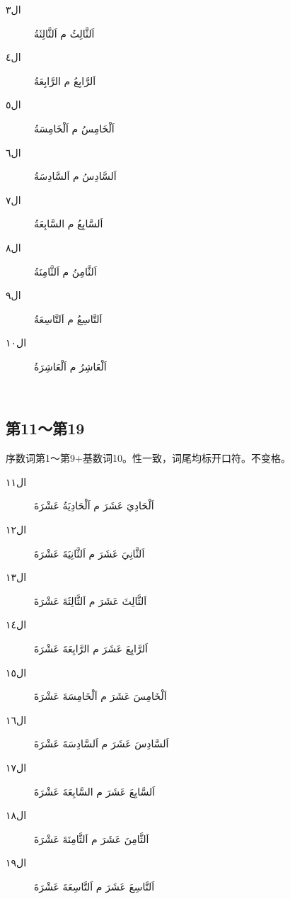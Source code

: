 \begin{Arabic}
    \begin{multicols}{3}
        \begin{description}
            \item[ال٣]  اَلثَّالِثُ م اَلثَّالِثَةُ
            \item[ال٤]  اَلرَّابِعُ م الرَّابِعَةُ
            \item[ال٥]  اَلْخَامِسُ م اَلْخَامِسَةُ
            \item[ال٦]  اَلسَّادِسُ م اَلسَّادِسَةُ
            \item[ال٧]  اَلسَّابِعُ م السَّابِعَةُ
            \item[ال٨]  اَلثَّامِنُ م اَلثَّامِنَةُ
            \item[ال٩]  اَلتَّاسِعُ م اَلتَّاسِعَةُ
            \item[ال١٠] اَلْعَاشِرُ م اَلْعَاشِرَةُ
            \item[~] 
        \end{description}
    \end{multicols}
\end{Arabic}

\subsection{第11～第19}

序数词第1～第9+基数词10。性一致，词尾均标开口符。不变格。

\begin{Arabic}
    \begin{multicols}{2}
        \begin{description}
            \item[ال١١] اَلْحَادِيَ عَشَرَ م اَلْحَادِيَةُ عَشْرَةَ
            \item[ال١٢] اَلثَّانِيَ عَشَرَ م اَلثَّانِيَةَ عَشْرَةَ
            \item[ال١٣] اَلثَّالِثَ عَشَرَ م اَلثَّالِثَةَ عَشْرَةَ
            \item[ال١٤] اَلرَّابِعَ عَشَرَ م الرَّابِعَةَ عَشْرَةَ
            \item[ال١٥] اَلْخَامِسَ عَشَرَ م اَلْخَامِسَةَ عَشْرَةَ
            \item[ال١٦] اَلسَّادِسَ عَشَرَ م اَلسَّادِسَةَ عَشْرَةَ
            \item[ال١٧] اَلسَّابِعَ عَشَرَ م السَّابِعَةَ عَشْرَةَ
            \item[ال١٨] اَلثَّامِنَ عَشَرَ م اَلثَّامِنَةَ عَشْرَةَ
            \item[ال١٩] اَلتَّاسِعَ عَشَرَ م اَلتَّاسِعَةَ عَشْرَةَ
            \item[~] 
        \end{description}
    \end{multicols}
\end{Arabic}

